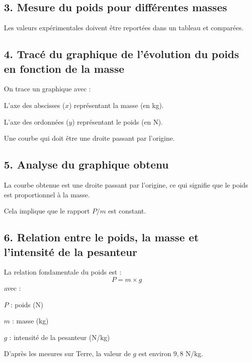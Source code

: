\documentclass[a4paper,12pt]{article}
\begin{document}
\subsection*{3. Mesure du poids pour différentes masses}
Les valeurs expérimentales doivent être reportées dans un tableau et comparées.

\subsection*{4. Tracé du graphique de l'évolution du poids en fonction de la masse}
On trace un graphique avec :
\begin{compactenum}
    \item L'axe des abscisses ($x$) représentant la masse (en kg).
    \item L'axe des ordonnées ($y$) représentant le poids (en N).
    \item Une courbe qui doit être une droite passant par l'origine.
\end{compactenum}

\subsection*{5. Analyse du graphique obtenu}
\begin{compactenum}
    \item La courbe obtenue est une droite passant par l'origine, ce qui signifie que le poids est proportionnel à la masse.
    \item Cela implique que le rapport $P / m$ est constant.
\end{compactenum}

\subsection*{6. Relation entre le poids, la masse et l'intensité de la pesanteur}
La relation fondamentale du poids est :
\begin{equation}
    P = m \times g
\end{equation}
avec :
\begin{compactenum}
    \item $P$ : poids (N)
    \item $m$ : masse (kg)
    \item $g$ : intensité de la pesanteur (N/kg)
\end{compactenum}
D'après les mesures sur Terre, la valeur de $g$ est environ $9,8$ N/kg.
\end{document}
